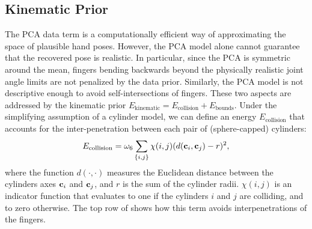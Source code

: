 \subsection*{Kinematic Prior}
The PCA data term is a computationally efficient way of approximating the space of plausible hand poses.
However, the PCA model alone cannot guarantee that the recovered pose is realistic. In particular, since the PCA is symmetric around the mean, fingers bending backwards beyond the physically realistic joint angle limits are not penalized by the data prior. Similarly, the PCA model is not descriptive enough to avoid self-intersections of fingers. These two aspects are addressed by the kinematic prior $E_{\text{kinematic}} = E_{\text{collision}} + E_{\text{bounds}}$.
%
%
Under the simplifying assumption of a cylinder model, we can define an energy $E_{\text{collision}}$ that accounts for the inter-penetration between each pair of (sphere-capped) cylinders:
% 
\begin{equation}
    E_{\text{collision}} = \omega_6 \sum_{\{i,j\}} {\chi(i,j)}(d(\mathbf{c}_i, \mathbf{c}_j) - r)^2,
\end{equation} 
%
where the function $d(\cdot,\cdot)$ measures the Euclidean distance between the cylinders axes $\mathbf{c}_i$ and $\mathbf{c}_j$, and $r$ is the sum of the cylinder radii. ${\chi(i,j)}$ is an indicator function that evaluates to one if the cylinders $i$ and $j$ are colliding, and to zero otherwise.
The top row of  shows how this term avoids interpenetrations of the fingers.
% 



